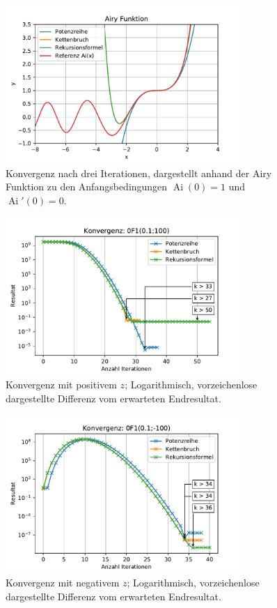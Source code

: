 \begin{figure}
    \centering
    \includegraphics[width=0.8\textwidth]{papers/0f1/images/konvergenzAiry.pdf}
    \caption{Konvergenz nach drei Iterationen, dargestellt anhand der Airy Funktion zu den Anfangsbedingungen $\operatorname{Ai}(0)=1$ und $\operatorname{Ai}'(0)=0$.
    \label{0f1:ausblick:plot:airy:konvergenz}}
\end{figure}

\begin{figure}
    \centering
    \includegraphics[width=0.8\textwidth]{papers/0f1/images/konvergenzPositiv.pdf}
    \caption{Konvergenz mit positivem $z$; Logarithmisch, vorzeichenlose dargestellte Differenz vom erwarteten Endresultat.
    \label{0f1:ausblick:plot:konvergenz:positiv}}
\end{figure}

\begin{figure}
    \centering
    \includegraphics[width=0.8\textwidth]{papers/0f1/images/konvergenzNegativ.pdf}
    \caption{Konvergenz mit negativem $z$; Logarithmisch, vorzeichenlose dargestellte Differenz vom erwarteten Endresultat.
    \label{0f1:ausblick:plot:konvergenz:negativ}}
\end{figure}

